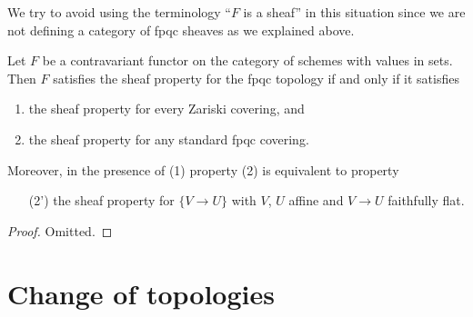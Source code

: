 \noindent
We try to avoid using the terminology ``$F$ is a sheaf'' in this
situation since we are not defining a category of fpqc sheaves
as we explained above.

\begin{lemma}
\label{lemma-sheaf-property-fpqc}
Let $F$ be a contravariant functor on the category
of schemes with values in sets. Then $F$ satisfies
the sheaf property for the fpqc topology if and only
if it satisfies
\begin{enumerate}
\item the sheaf property for every Zariski covering, and
\item the sheaf property for any standard fpqc covering.
\end{enumerate}
Moreover, in the presence of (1) property (2) is equivalent to
property
\begin{enumerate}
\item[(2')] the sheaf property for $\{V \to U\}$
with $V$, $U$ affine and $V \to U$ faithfully flat.
\end{enumerate}
\end{lemma}

\begin{proof}
Omitted.
\end{proof}












\section{Change of topologies}
\label{section-change-topologies}

